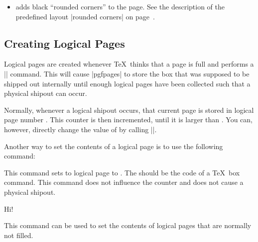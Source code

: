 \begin{command}{\pgfpageslogicalpageoptions{}}
\begin{itemize}
    You can also call |\pgfdiscardpath| and add your own path
    construction code (for example to paint a rectangle with rounded
    corners). The coordinate system is  set up in such a way that a
    rectangle starting at the origin and having the height and width
    of \TeX-box 0 will result in a rectangle filling exactly the
    logical page currently being put on the physical page. The logical
    page is inserted \emph{after} these commands have been executed.

    \example Add a rectangle around the page:
\begin{codeexample}
\end{codeexample}
  \item
    adds black ``rounded corners'' to the page. See the description of
    the predefined layout |rounded corners| on
    page~\pageref{layout-rounded-corners}.
  \end{itemize}
\end{command}




\subsection{Creating Logical Pages}

Logical pages are created whenever \TeX\ thinks that a page is full
and performs a |\shipout| command. This will cause |pgfpages| to store
the box that was supposed to be shipped out internally until enough
logical pages have been collected such that a physical shipout can
occur.

Normally, whenever a logical shipout occurs, that current page is
stored in logical page number . This
counter is then incremented, until it is larger than . You can, however, directly change the value of
 by calling |\pgfpagesphysicalpageoptions|.

Another way to set the contents of a logical page is to use the
following command:

\begin{command}{\pgfpagesshipoutlogicalpage{}}
  This command sets to logical page  to . The
   should be the code of a \TeX\ box command. This command
  does not influence the counter  and does
  not cause a physical shipout.

\begin{codeexample}
\vbox{Hi!}
\end{codeexample}

  This command can be used to set the contents of logical pages that
  are normally not filled.
\end{command}

